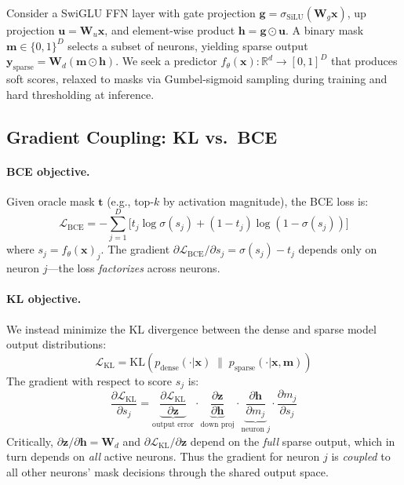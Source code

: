 \documentclass[11pt,a4paper]{article}
\begin{document}
Consider a SwiGLU FFN layer with gate projection $\mathbf{g} = \sigma_{\mathrm{SiLU}}(\mathbf{W}_g \mathbf{x})$, up projection $\mathbf{u} = \mathbf{W}_u \mathbf{x}$, and element-wise product $\mathbf{h} = \mathbf{g} \odot \mathbf{u}$.
A binary mask $\mathbf{m} \in \{0,1\}^D$ selects a subset of neurons, yielding sparse output $\mathbf{y}_{\mathrm{sparse}} = \mathbf{W}_d (\mathbf{m} \odot \mathbf{h})$.
We seek a predictor $f_\theta(\mathbf{x}): \mathbb{R}^{d} \to [0,1]^D$ that produces soft scores, relaxed to masks via Gumbel-sigmoid sampling during training and hard thresholding at inference.

\subsection{Gradient Coupling: KL vs.\ BCE}

\paragraph{BCE objective.}
Given oracle mask $\mathbf{t}$ (e.g., top-$k$ by activation magnitude), the BCE loss is:
\begin{equation}
\mathcal{L}_{\mathrm{BCE}} = -\sum_{j=1}^{D} \big[ t_j \log \sigma(s_j) + (1-t_j)\log(1-\sigma(s_j)) \big]
\end{equation}
where $s_j = f_\theta(\mathbf{x})_j$.
The gradient $\partial\mathcal{L}_{\mathrm{BCE}}/\partial s_j = \sigma(s_j) - t_j$ depends only on neuron $j$---the loss \emph{factorizes} across neurons.

\paragraph{KL objective.}
We instead minimize the KL divergence between the dense and sparse model output distributions:
\begin{equation}
\mathcal{L}_{\mathrm{KL}} = \mathrm{KL}\!\left(p_{\mathrm{dense}}(\cdot|\mathbf{x}) \;\|\; p_{\mathrm{sparse}}(\cdot|\mathbf{x}, \mathbf{m})\right)
\end{equation}
The gradient with respect to score $s_j$ is:
\begin{equation}
\frac{\partial\mathcal{L}_{\mathrm{KL}}}{\partial s_j} = \underbrace{\frac{\partial\mathcal{L}_{\mathrm{KL}}}{\partial \mathbf{z}}}_{\text{output error}} \cdot \underbrace{\frac{\partial \mathbf{z}}{\partial \mathbf{h}}}_{\text{down proj}} \cdot \underbrace{\frac{\partial \mathbf{h}}{\partial m_j}}_{\text{neuron }j} \cdot \frac{\partial m_j}{\partial s_j}
\end{equation}
Critically, $\partial\mathbf{z}/\partial\mathbf{h} = \mathbf{W}_d$ and $\partial\mathcal{L}_{\mathrm{KL}}/\partial\mathbf{z}$ depend on the \emph{full} sparse output, which in turn depends on \emph{all} active neurons.
Thus the gradient for neuron $j$ is \emph{coupled} to all other neurons' mask decisions through the shared output space.
\end{document}
